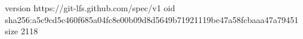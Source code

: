 version https://git-lfs.github.com/spec/v1
oid sha256:a5c9cd5c460f685a04fc8e00b09d8d5649b71921119be47a58fcbaaa47a79451
size 2118
